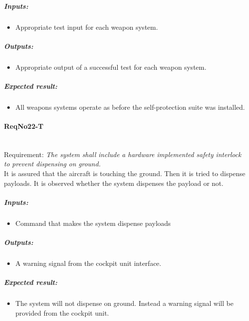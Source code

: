 	\subparagraph{Inputs:}
	\begin{itemize}
	\item Appropriate test input for each weapon system.
	\end{itemize}
	\subparagraph{Outputs:}
	\begin{itemize}
	\item Appropriate output of a successful test for each weapon system.
	\end{itemize}
	\subparagraph{Expected result:}
	\begin{itemize}
	\item All weapons systems operate as before the self-protection suite was installed.
	\end{itemize}

\paragraph{ReqNo22-T}\mbox{}\\ %
Requirement: \textit{The system shall include a hardware implemented safety interlock to prevent dispensing on ground.}
\\
It is assured that the aircraft is touching the ground. Then it is tried to dispense payloads. It is observed whether the system dispenses the payload or not.
\\
	\subparagraph{Inputs:}
	\begin{itemize}
	\item Command that makes the system dispense payloads 
	\end{itemize}
	\subparagraph{Outputs:}
	\begin{itemize}
	\item A warning signal from the cockpit unit interface.
	\end{itemize}
	\subparagraph{Expected result:}
	\begin{itemize}
	\item The system will not dispense on ground. Instead a warning signal will be provided from the cockpit unit.
	\end{itemize}

